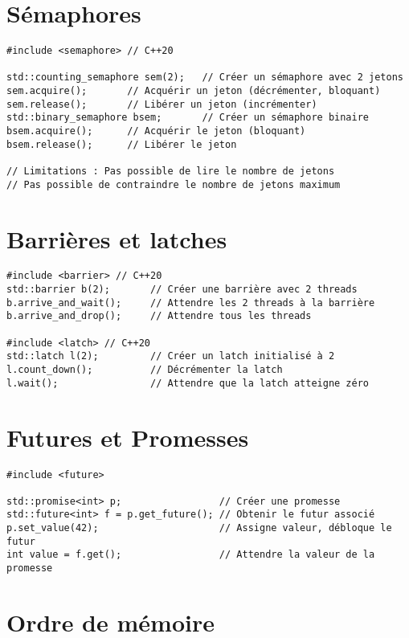 \documentclass{article}
\begin{document}
\begin{multicols*}{3}
\section*{Sémaphores}

\begin{lstlisting}
#include <semaphore> // C++20

std::counting_semaphore sem(2);   // Créer un sémaphore avec 2 jetons
sem.acquire();       // Acquérir un jeton (décrémenter, bloquant)
sem.release();       // Libérer un jeton (incrémenter)
std::binary_semaphore bsem;       // Créer un sémaphore binaire
bsem.acquire();      // Acquérir le jeton (bloquant)
bsem.release();      // Libérer le jeton

// Limitations : Pas possible de lire le nombre de jetons
// Pas possible de contraindre le nombre de jetons maximum
\end{lstlisting}

\section*{Barrières et latches}
\begin{lstlisting}
#include <barrier> // C++20
std::barrier b(2);       // Créer une barrière avec 2 threads
b.arrive_and_wait();     // Attendre les 2 threads à la barrière
b.arrive_and_drop();     // Attendre tous les threads

#include <latch> // C++20
std::latch l(2);         // Créer un latch initialisé à 2
l.count_down();          // Décrémenter la latch
l.wait();                // Attendre que la latch atteigne zéro
\end{lstlisting}

\section*{Futures et Promesses}

\begin{lstlisting}
#include <future>

std::promise<int> p;                 // Créer une promesse
std::future<int> f = p.get_future(); // Obtenir le futur associé
p.set_value(42);                     // Assigne valeur, débloque le futur
int value = f.get();                 // Attendre la valeur de la promesse
\end{lstlisting}

\section*{Ordre de mémoire}


\end{multicols*}
\end{document}
